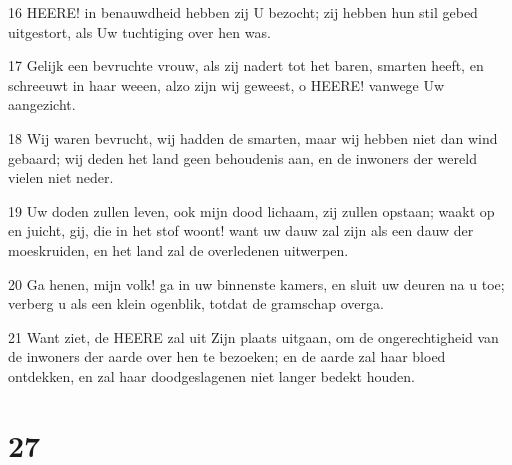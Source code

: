 \par 16 HEERE! in benauwdheid hebben zij U bezocht; zij hebben hun stil gebed uitgestort, als Uw tuchtiging over hen was.
\par 17 Gelijk een bevruchte vrouw, als zij nadert tot het baren, smarten heeft, en schreeuwt in haar weeen, alzo zijn wij geweest, o HEERE! vanwege Uw aangezicht.
\par 18 Wij waren bevrucht, wij hadden de smarten, maar wij hebben niet dan wind gebaard; wij deden het land geen behoudenis aan, en de inwoners der wereld vielen niet neder.
\par 19 Uw doden zullen leven, ook mijn dood lichaam, zij zullen opstaan; waakt op en juicht, gij, die in het stof woont! want uw dauw zal zijn als een dauw der moeskruiden, en het land zal de overledenen uitwerpen.
\par 20 Ga henen, mijn volk! ga in uw binnenste kamers, en sluit uw deuren na u toe; verberg u als een klein ogenblik, totdat de gramschap overga.
\par 21 Want ziet, de HEERE zal uit Zijn plaats uitgaan, om de ongerechtigheid van de inwoners der aarde over hen te bezoeken; en de aarde zal haar bloed ontdekken, en zal haar doodgeslagenen niet langer bedekt houden.

\chapter{27}

